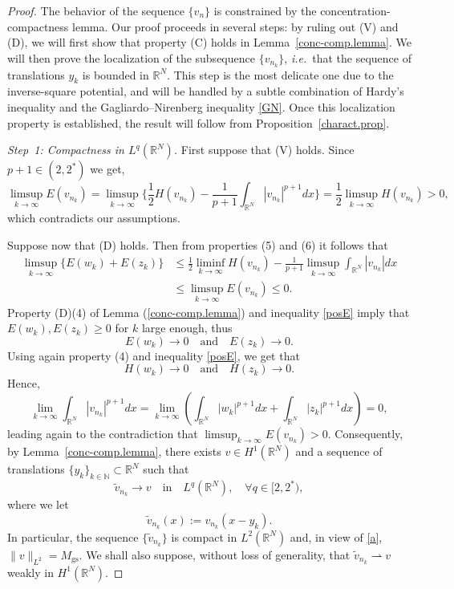 \documentclass[reqno]{amsart}
\newcommand{\real}{\mathbb{R}}
\newcommand{\rn}{\real^N}
\newcommand{\N}{\mathbb{N}}
\newcommand{\wto}{\rightharpoonup}
\newcommand{\wt}{\widetilde}
\let\le=\leqslant
\let\ge= \geqslant
\theoremstyle{plain}
\theoremstyle{definition}
\numberwithin{equation}{section}
\begin{document}
\begin{proof}
The behavior of the sequence $\{v_n\}$ is constrained by the concentration-compactness lemma. 
Our proof proceeds in several steps: by ruling out (V) and (D),
we will first show that property (C) holds in Lemma~\ref{conc-comp.lemma}. We will then prove
the localization of the subsequence $\{v_{n_k}\}$, {\em i.e.}~that
the sequence of translations ${y_k}$ is bounded in $\rn$. This step is the most delicate one
due to the inverse-square potential, and will be handled by a subtle combination of Hardy's inequality
and the Gagliardo--Nirenberg inequality \eqref{GN}. Once this localization property is established, 
the result will follow from Proposition~\ref{charact.prop}.

\medskip
\noindent
{\em Step~1: Compactness in $L^q(\rn)$.}
First suppose that (V) holds. Since $p+1\in (2,2^*)$ we get,
\[
\limsup_{k\rightarrow\infty} E(v_{n_k})=\limsup_{k\rightarrow\infty}\Big\{\frac{1}{2}H(v_{n_k})-\frac{1}{p+1}\int_{\rn} |v_{n_k}|^{p+1}dx\Big\}=\frac{1}{2}\limsup_{k\rightarrow\infty}H(v_{n_k})>0,
\]
which contradicts our assumptions.

Suppose now that (D) holds. Then from properties (5) and (6) it follows that
\[
\begin{split}
\limsup_{k\rightarrow\infty}\{E(w_k)+E(z_k)\}&\le\frac{1}{2}\liminf_{k\rightarrow\infty}H(v_{n_k})
-\frac{1}{p+1}\limsup_{k\rightarrow\infty}\int_{\rn}|v_{n_k}|dx \\
&\le\limsup_{k\rightarrow\infty} E(v_{n_k})\le 0.
\end{split}
\]
Property (D)(4) of Lemma (\ref{conc-comp.lemma}) and inequality \eqref{posE} 
imply that $E(w_k), E(z_k)\ge 0$ for $k$ large enough, thus
\[
E(w_k)\rightarrow 0 \quad \text{and} \quad E(z_k)\rightarrow 0.
\]
Using again property (4) and inequality \eqref{posE}, we get that
\[
H(w_k)\rightarrow 0 \quad\text{and}\quad H(z_k)\rightarrow 0.
\]
Hence,
\[
\lim_{k\rightarrow\infty}\int_{\rn}|v_{n_k}|^{p+1}dx
=\lim_{k\rightarrow\infty}\left(\int_{\rn}|w_k|^{p+1}dx+\int_{\rn}|z_k|^{p+1}dx\right)=0,
\]
leading again to the contradiction that $\limsup_{k\rightarrow\infty}E(v_{n_k})>0$. Consequently,
by Lemma~\ref{conc-comp.lemma}, there exists $v\in H^1(\rn)$
and a sequence of translations $\{y_k\}_{k\in\N}\subset \rn$ such that
\begin{equation}\label{tildecompact}
\wt{v}_{n_k} \rightarrow v \quad \text{in} \quad L^q(\rn), \quad \forall q\in[2,2^*),
\end{equation}
where we let
\[
\wt{v}_{n_k}(x):=v_{n_k}(x-y_k). 
\]
In particular, the sequence $\{\wt{v}_{n_k}\}$
is compact in $L^2(\rn)$ and, in view of \eqref{a}, $\|v\|_{L^2}=M_\mathrm{gs}$. We shall
also suppose, without loss of generality, that $\wt{v}_{n_k}\wto v$ weakly in $H^1(\rn)$.


\end{proof}
\end{document}
